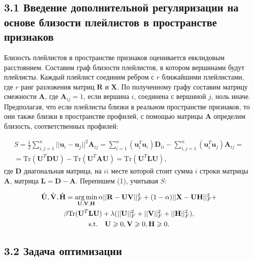 \documentclass[12pt,twoside]{article}
\begin{document}
\subsection{3.1 Введение дополнительной регуляризации на основе близости плейлистов в пространстве признаков}

Близость плейлистов в пространстве признаков оценивается евклидовым расстоянием. Составим граф близости плейлистов, в котором вершинами будут плейлисты. Каждый плейлист соединим ребром с $r$ ближайшими плейлистами, где $r$ ранг разложения матриц $\mathbf{R}$ и $\mathbf{X}$. По полученному графу составим матрицу смежности $\mathbf{A}$, где $\mathbf{A}_{ij} = 1$, если вершина $i$, соединена с вершиной $j$, ноль иначе. Предполагая, что если плейлисты близки в реальном пространстве признаков, то они также близки в пространстве профилей, с помощью матрицы $\mathbf{A}$ определим близость, соответственных профилей:

\begin{equation}
\begin{gathered}
S = \frac{1}{2}\sum_{i, j = 1}^n||\mathbf{u}_i - \mathbf{u}_j||^2\mathbf{A}_{ij} = \sum_{i = 1}^n (\mathbf{u}_i^{T}\mathbf{u}_i)\mathbf{D}_{ii} - \sum_{i,j = 1}^n (\mathbf{u}_i^{T}\mathbf{u}_j)\mathbf{A}_{ij} =\\= \text{Tr}(\mathbf{U}^{T}\mathbf{DU}) -  \text{Tr}(\mathbf{U}^{T}\mathbf{AU}) = \text{Tr}(\mathbf{U}^{T}\mathbf{LU}),
\end{gathered}
\end{equation}
где $\mathbf{D}$ диагональная матрица, на $ii$ месте которой стоит сумма $i$ строки матрицы $\mathbf{A}$, матрица $\mathbf{L} = \mathbf{D} - \mathbf{A}$. Перепишем (1), учитывая $S$:

\begin{equation}
\begin{gathered}
\hat{\mathbf{U}}, \hat{\mathbf{V}}, \hat{\mathbf{H}} = \argmin_{\mathbf{U, V, H}}\alpha||\mathbf{R} - \mathbf{UV}||_F^2 +(1 - \alpha) ||\mathbf{X} - \mathbf{UH}||_F^2 + \\ \beta\text{Tr}(\mathbf{U}^T\mathbf{LU}) +  \lambda(||\mathbf{U}||_F^2 + ||\mathbf{V}||_F^2 + ||\mathbf{H}||_F^2),\\
\text{s.t.} \quad \mathbf{U} \geq 0,  \mathbf{V} \geq 0,  \mathbf{H} \geq 0.
\end{gathered}
\end{equation}

\subsection{3.2 Задача оптимизации}
\end{document}

